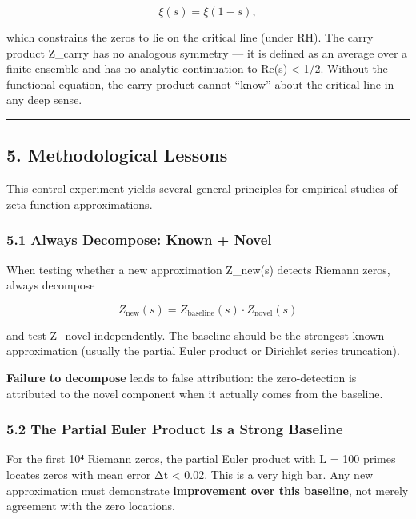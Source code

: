 \documentclass[
  11pt,
]{article}
\begin{document}
\[\xi(s) = \xi(1 - s),\]

which constrains the zeros to lie on the critical line (under RH). The carry
product Z\_carry has no analogous symmetry --- it is defined as an average over
a finite ensemble and has no analytic continuation to Re(s) \textless{} 1/2.
Without the functional equation, the carry product cannot ``know'' about the
critical line in any deep sense.

\begin{center}\rule{0.5\linewidth}{0.5pt}\end{center}

\newpage

\subsection{5. Methodological Lessons}\label{methodological-lessons}

This control experiment yields several general principles for empirical studies
of zeta function approximations.

\subsubsection{5.1 Always Decompose: Known +
Novel}\label{always-decompose-known-novel}

When testing whether a new approximation Z\_new(s) detects Riemann zeros, always
decompose

\[Z_{\text{new}}(s) = Z_{\text{baseline}}(s) \cdot Z_{\text{novel}}(s)\]

and test Z\_novel independently. The baseline should be the strongest known
approximation (usually the partial Euler product or Dirichlet series
truncation).

\textbf{Failure to decompose} leads to false attribution: the zero-detection is
attributed to the novel component when it actually comes from the baseline.

\subsubsection{5.2 The Partial Euler Product Is a Strong
Baseline}\label{the-partial-euler-product-is-a-strong-baseline}

For the first 10⁴ Riemann zeros, the partial Euler product with L = 100 primes
locates zeros with mean error Δt \textless{} 0.02. This is a very high bar. Any
new approximation must demonstrate \textbf{improvement over this baseline}, not
merely agreement with the zero locations.
\end{document}
